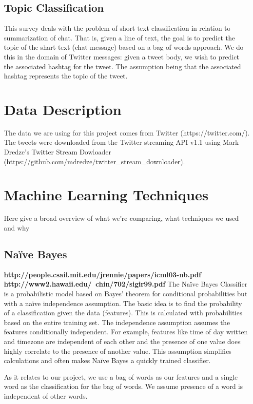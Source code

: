 \documentclass[11pt,letterpaper]{article}
\begin{document}
\subsection{Topic Classification}
  This survey deals with the problem of short-text classification in relation to summarization of chat. That is, given a line of text, the goal is to predict the topic of the shart-text (chat message) based on a bag-of-words approach. We do this in the domain of Twitter messages: given a tweet body, we wish to predict the associated hashtag for the tweet. The assumption being that the associated hashtag represents the topic of the tweet.
  


\section{Data Description}
The data we are using for this project comes from Twitter (https://twitter.com/). The tweets were downloaded from the Twitter streaming API v1.1 using Mark Dredze's Twitter Stream Dowloader (https://github.com/mdredze/twitter_stream_downloader).

\section{Machine Learning Techniques}
Here give a broad overview of what we're comparing, what techniques we used and why

\subsection{Na{\"i}ve Bayes}
\textbf{http://people.csail.mit.edu/jrennie/papers/icml03-nb.pdf} \textbf{http://www2.hawaii.edu/~chin/702/sigir99.pdf}
  The Na{\"i}ve Bayes Classifier is a probabilistic model based on Bayes' theorem for conditional probabilities but with a na{\"i}ve independence assumption. The basic idea is to find the probability of a classification given the data  (features). This is calculated with probabilities based on the entire training set. The independence assumption assumes the features conditionally independent. For example, features like time of day written and timezone are independent of each other and the presence of one value does highly correlate to the presence of another value. This assumption simplifies calculations and often makes Na{\"i}ve Bayes a quickly trained classifier.

As it relates to our project, we use a bag of words as our features and a single word as the classification for the bag of words. We assume presence of a word is independent of other words. 
\end{document}
